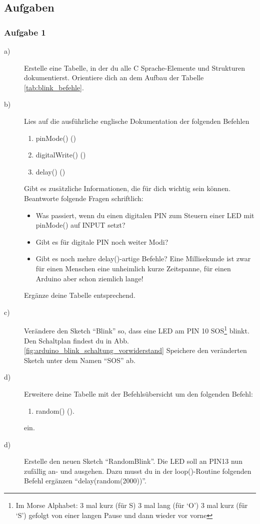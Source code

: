 \subsection{Aufgaben}

\subsubsection{Aufgabe 1}

\begin{description}
  \item[a)] Erstelle eine Tabelle, in der du alle C Sprache-Elemente und Strukturen dokumentierst. Orientiere dich an dem Aufbau der Tabelle  \ref{tab:blink_befehle}.   
  \item[b)] Lies auf  die ausführliche englische Dokumentation der folgenden Befehlen
  \begin{enumerate}
    \item pinMode()  ()
    \item digitalWrite()  ()
    \item delay()  ()
  \end{enumerate} 
  Gibt es zusätzliche Informationen, die für dich wichtig sein können. Beantworte folgende Fragen schriftlich:
  \begin{itemize}
    \item Was passiert, wenn du einen digitalen PIN zum Steuern einer LED mit pinMode() auf INPUT setzt?
    \item Gibt es für digitale PIN noch weiter Modi?  
    \item Gibt es noch mehre delay()-artige Befehle? Eine Millisekunde ist zwar für einen Menschen eine unheimlich kurze Zeitspanne, für einen Arduino aber schon ziemlich lange!   
  \end{itemize}
  Ergänze deine Tabelle entsprechend.
  \item[c)]Verändere den Sketch ``Blink'' so, dass eine LED am PIN 10 SOS\footnote{Im Morse Alphabet: 
    3 mal kurz (für S) 3 mal lang (für `O') 3 mal kurz (für `S') gefolgt von einer langen Pause und dann wieder vor 
    vorne} blinkt. Den Schaltplan findest du in Abb. \ref{fig:arduino_blink_schaltung_vorwiderstand} 
    Speichere den veränderten Sketch unter dem Namen ``SOS'' ab.
  \item[d)] Erweitere deine Tabelle  mit der Befehlsübersicht um  den folgenden Befehl: 
  \begin{enumerate}
    \item random()  ().
  \end{enumerate}
  ein.
  \item[d)] Erstelle den neuen Sketch ``RandomBlink''. Die LED soll an PIN13 nun zufällig an- und ausgehen. 
  Dazu musst du in der loop()-Routine folgenden Befehl ergänzen ``delay(random(2000))''.  
\end{description}

